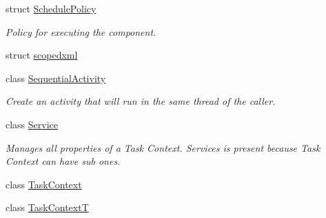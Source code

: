 \begin{DoxyCompactItemize}
struct \hyperlink{structcoco_1_1_schedule_policy}{Schedule\+Policy}
\begin{DoxyCompactList}\small\item\em Policy for executing the component. \end{DoxyCompactList}\item 
struct \hyperlink{structcoco_1_1scopedxml}{scopedxml}
\item 
class \hyperlink{classcoco_1_1_sequential_activity}{Sequential\+Activity}
\begin{DoxyCompactList}\small\item\em Create an activity that will run in the same thread of the caller. \end{DoxyCompactList}\item 
class \hyperlink{classcoco_1_1_service}{Service}
\begin{DoxyCompactList}\small\item\em Manages all properties of a Task Context. Services is present because Task Context can have sub ones. \end{DoxyCompactList}\item 
class \hyperlink{classcoco_1_1_task_context}{Task\+Context}
\item 
class \hyperlink{classcoco_1_1_task_context_t}{Task\+Context\+T}
\end{DoxyCompactItemize}
